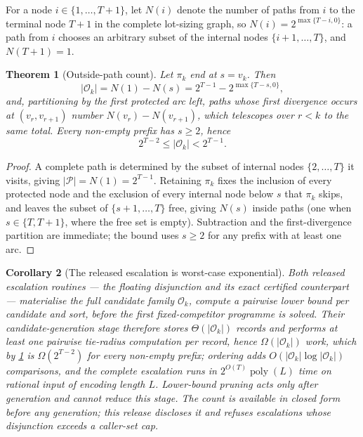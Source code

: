 \documentclass[11pt]{article}
\newtheorem{theorem}{Theorem}[section]
\newtheorem{corollary}[theorem]{Corollary}
\theoremstyle{definition}
\newcommand{\cO}{\mathcal{O}}
\newcommand{\cP}{\mathcal{P}}
\begin{document}
For a node $i\in\{1,\ldots,T+1\}$, let $N(i)$ denote the number of paths
from $i$ to the terminal node $T+1$ in the complete lot-sizing graph, so
$N(i)=2^{\max\{T-i,0\}}$: a path from $i$ chooses an arbitrary subset of
the internal nodes $\{i+1,\ldots,T\}$, and $N(T+1)=1$.

\begin{theorem}[Outside-path count]\label{thm:outsidecount}
Let $\pi_k$ end at $s=v_k$. Then
\[
\lvert\cO_k\rvert
=N(1)-N(s)
=2^{T-1}-2^{\max\{T-s,0\}},
\]
and, partitioning by the first protected arc left, paths whose first
divergence occurs at $(v_r,v_{r+1})$ number $N(v_r)-N(v_{r+1})$, which
telescopes over $r<k$ to the same total. Every non-empty prefix has
$s\ge2$, hence
\[
2^{T-2}\le\lvert\cO_k\rvert<2^{T-1}.
\]
\end{theorem}

\begin{proof}
A complete path is determined by the subset of internal nodes
$\{2,\ldots,T\}$ it visits, giving $\lvert\cP\rvert=N(1)=2^{T-1}$.
Retaining $\pi_k$ fixes the inclusion of every protected node and the
exclusion of every internal node below $s$ that $\pi_k$ skips, and leaves
the subset of $\{s+1,\ldots,T\}$ free, giving $N(s)$ inside paths (one
when $s\in\{T,T+1\}$, where the free set is empty). Subtraction and the
first-divergence partition are immediate; the bound uses $s\ge2$ for any
prefix with at least one arc.
\end{proof}

\begin{corollary}[The released escalation is worst-case exponential]\label{cor:enumexp}
Both released escalation routines --- the floating disjunction and its
exact certified counterpart --- materialise the full candidate family
$\cO_k$, compute a pairwise lower bound per candidate and sort, before the
first fixed-competitor programme is solved. Their candidate-generation
stage therefore stores $\Theta(\lvert\cO_k\rvert)$ records and performs at
least one pairwise tie-radius computation per record, hence
$\Omega(\lvert\cO_k\rvert)$ work, which by \cref{thm:outsidecount} is
$\Omega(2^{T-2})$ for every non-empty prefix; ordering adds
$O(\lvert\cO_k\rvert\log\lvert\cO_k\rvert)$ comparisons, and the complete
escalation runs in $2^{O(T)}\operatorname{poly}(L)$ time on rational input
of encoding length $L$. Lower-bound pruning acts only after generation and
cannot reduce this stage. The count is available in closed form before
any generation; this release discloses it and refuses escalations whose
disjunction exceeds a caller-set cap.
\end{corollary}
\end{document}
